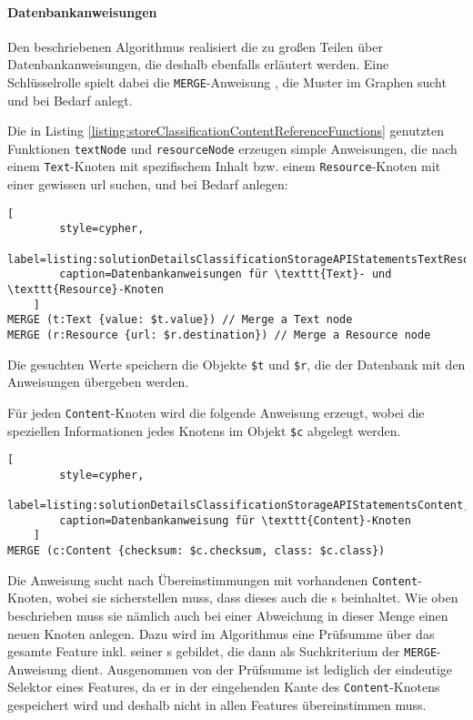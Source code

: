     \paragraph{Datenbankanweisungen}
    Den beschriebenen Algorithmus realisiert die {\classificationStorageAPI}
    zu großen Teilen über Datenbankanweisungen,
    die deshalb ebenfalls erläutert werden.
    Eine Schlüsselrolle spielt dabei die \texttt{MERGE}-Anweisung \cite[Kapitel 3.3.16]{neo4j:documentation},
    die Muster im Graphen sucht und bei Bedarf anlegt.

    Die in Listing \ref{listing:storeClassificationContentReferenceFunctions} genutzten
    Funktionen \texttt{textNode} und \texttt{resourceNode} erzeugen simple Anweisungen,
    die nach einem \texttt{Text}-Knoten mit spezifischem Inhalt bzw.
    einem \texttt{Resource}-Knoten mit einer gewissen \gls{url} suchen,
    und bei Bedarf anlegen:

    \begin{lstlisting}[
        style=cypher,
        label=listing:solutionDetailsClassificationStorageAPIStatementsTextResource,
        caption=Datenbankanweisungen für \texttt{Text}- und \texttt{Resource}-Knoten
    ]
MERGE (t:Text {value: $t.value}) // Merge a Text node
MERGE (r:Resource {url: $r.destination}) // Merge a Resource node
    \end{lstlisting}
    
    Die gesuchten Werte speichern die Objekte \verb+$t+ und \verb+$r+,
    die der Datenbank mit den Anweisungen übergeben werden.

    Für jeden \texttt{Content}-Knoten wird die folgende Anweisung erzeugt,
    wobei die speziellen Informationen jedes Knotens im Objekt \verb+$c+
    abgelegt werden.

    \begin{lstlisting}[
        style=cypher,
        label=listing:solutionDetailsClassificationStorageAPIStatementsContent,
        caption=Datenbankanweisung für \texttt{Content}-Knoten
    ]
MERGE (c:Content {checksum: $c.checksum, class: $c.class})
    \end{lstlisting}

    Die Anweisung sucht nach Übereinstimmungen mit vorhandenen \texttt{Content}-Knoten,
    wobei sie sicherstellen muss, dass dieses auch die {\childFeature}s beinhaltet.
    Wie oben beschrieben muss sie nämlich auch bei einer Abweichung in dieser Menge einen neuen Knoten anlegen.
    Dazu wird im Algorithmus  eine Prüfsumme über das gesamte Feature inkl. seiner {\childFeature}s gebildet,
    die dann als Suchkriterium der \texttt{MERGE}-Anweisung dient.
    Ausgenommen von der Prüfsumme ist lediglich der eindeutige Selektor eines Features,
    da er in der eingehenden Kante des \texttt{Content}-Knotens gespeichert wird
    und deshalb nicht in allen Features übereinstimmen muss.

